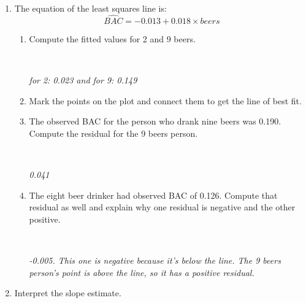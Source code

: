 \begin{enumerate}
\begin{enumerate}
\begin{key}
  {\it linear, strong, positive, $r = 0.90$ }
\end{key}

  \item The equation of the least squares line is:
  $$  \widehat{BAC} =  -0.013 + 0.018\times{beers}$$
  \begin{enumerate}
  \item Compute the fitted values for 2 and 9 beers.
\begin{students}
 \vspace{2cm}\\
\end{students}

\begin{key}
  {\it  for 2: 0.023  and for 9:  0.149}
\end{key}
   \item  Mark the points on the plot and connect them to get the line
     of best fit. \vspace{.2in}
   \item The observed BAC for the person who drank nine beers was 
     0.190. Compute the residual for the 9 beers person. 
\begin{students}
 \vspace{2cm}\\
\end{students}

\begin{key}
  {\it  0.041}
\end{key}
   \item  The eight beer drinker had observed BAC of 0.126. Compute
     that residual as well and explain why one residual is negative
     and the other positive.
\begin{students}
 \vspace{2cm}\\
\end{students}

\begin{key}
  {\it  -0.005. This one is negative because it's below the line. The
    9 beers person's point is above the line, so it has a positive residual.}
\end{key}

\end{enumerate}
\item Interpret the slope estimate. 
\begin{students}
 \vspace{2cm}
\end{students}


\end{enumerate}
\end{enumerate}

